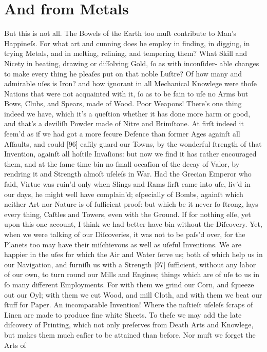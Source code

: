 \documentclass[letterpaper]{book}
\begin{document}
\section{And from Metals}

But this is not all. The Bowels of the Earth too muſt contribute to Man's
Happineſs. For what art and cunning does he employ in finding, in digging,
in trying Metals, and in melting, refining, and tempering them? What Skill
and Nicety in beating, drawing or diſſolving Gold, ſo as with inconſider-
able changes to make every thing he pleaſes put on that noble Luſtre? Of how
many and admirable uſes is Iron? and how ignorant in all Mechanical
Knowlege were thoſe Nations that were not acquainted with it, ſo as to be
fain to uſe no Arms but Bows, Clubs, and Spears, made of Wood.  Poor
Weapons! There's one thing indeed we have, which it's a queſtion whether it
has done more harm or good, and that's a deviliſh Powder made of Nitre and
Brimſtone. At firſt indeed it ſeem'd as if we had got a more ſecure Defence
than former Ages againſt all Aſſaults, and could [96] eaſily guard our
Towns, by the wonderful ſtrength of that Invention, againſt all hoſtile
Invaſions: but now we find it has rather encouraged them, and at the ſame
time bin no ſmall occaſion of the decay of Valor, by rendring it and
Strength almoſt uſeleſs in War. Had the Grecian Emperor who ſaid, Virtue was
ruin'd only when Slings and Rams firſt came into uſe, liv'd in our days, he
might well have complain'd; eſpecially of Bombs, againſt which neither Art
nor Nature is of ſufficient proof: but which be it never ſo ſtrong, lays
every thing, Caſtles and Towers, even with the Ground. If for nothing elſe,
yet upon this one account, I think we had better have bin without the
Diſcovery. Yet, when we were talking of our Diſcoveries, it was not to be
paſs'd over, for the Planets too may have their miſchievous as well as
uſeful Inventions.  We are happier in the uſes for which the Air and Water
ſerve us; both of which help us in our Navigation, and furniſh us with a
Strength [97] ſufficient, without any labor of our own, to turn round our
Mills and Engines; things which are of uſe to us in ſo many different
Employments. For with them we grind our Corn, and ſqueeze out our Oyl; with
them we cut Wood, and mill Cloth, and with them we beat our ſtuff for Paper.
An incomparable Invention! Where the naſtieſt uſeleſs ſcraps of Linen are
made to produce fine white Sheets. To theſe we may add the late diſcovery of
Printing, which not only preſerves from Death Arts and Knowlege, but makes
them much eaſier to be attained than before. Nor muſt we forget the Arts of
\end{document}
